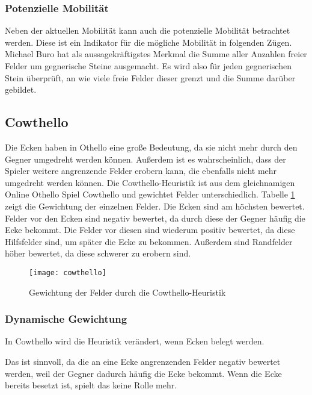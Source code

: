 \subsubsection{Potenzielle Mobilität}
Neben der aktuellen Mobilität kann auch die potenzielle Mobilität betrachtet werden. Diese ist ein Indikator für die
mögliche Mobilität in folgenden Zügen. Michael Buro hat als aussagekräftigstes Merkmal die Summe aller Anzahlen freier
Felder um gegnerische Steine ausgemacht. Es wird also für jeden gegnerischen Stein überprüft, an wie viele freie Felder
dieser grenzt und die Summe darüber gebildet.
\cite[S. 8f.]{evaluationfunctions}

\subsection{Cowthello}
Die Ecken haben in Othello eine große Bedeutung, da sie nicht mehr durch den Gegner umgedreht werden können. Außerdem
ist es wahrscheinlich, dass der Spieler weitere angrenzende Felder erobern kann, die ebenfalls nicht mehr umgedreht
werden können. Die Cowthello-Heuristik ist aus dem gleichnamigen Online Othello Spiel Cowthello und gewichtet Felder
unterschiedlich.
\cite{cowthello}
Tabelle \ref{fig:cowthello} zeigt die Gewichtung der einzelnen Felder. Die Ecken sind am höchsten bewertet. Felder vor
den Ecken sind negativ bewertet, da durch diese der Gegner häufig die Ecke bekommt. Die Felder vor diesen sind wiederum
positiv bewertet, da diese Hilfsfelder sind, um später die Ecke zu bekommen. Außerdem sind Randfelder höher bewertet, da
diese schwerer zu erobern sind.%

\begin{figure}[H]
    \centering
    \texttt{[image: cowthello]}
    \caption{Gewichtung der Felder durch die Cowthello-Heuristik}
    \label{fig:cowthello}
\end{figure}

\subsubsection{Dynamische Gewichtung}
In Cowthello wird die Heuristik verändert, wenn Ecken belegt werden.
\cite{cowthello}

Das ist sinnvoll, da die an eine Ecke angrenzenden Felder negativ bewertet werden, weil der Gegner dadurch häufig die
Ecke bekommt. Wenn die Ecke bereits besetzt ist, spielt das keine Rolle mehr.%
